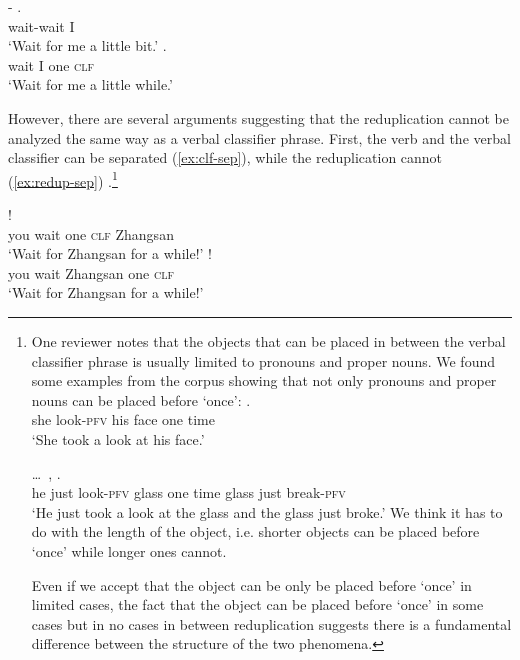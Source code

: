 \ea\label{ex:redup-clf}
	\ea \gll {}- .\\
		wait-wait I\\
		\glt `Wait for me a little bit.'
	\ex \gll {}   .\\
	wait I one \textsc{clf}\\
	\glt `Wait for me a little while.'
	\z
\z

However, there are several arguments suggesting that the reduplication cannot be analyzed the same way as a verbal classifier phrase. First, the verb and the verbal classifier can be separated (\ref{ex:clf-sep}), while the reduplication cannot (\ref{ex:redup-sep}) \citep[269]{Paris2013}.\footnote{
One reviewer notes that the objects that can be placed in between the verbal classifier phrase is usually limited to pronouns and proper nouns.
We found some examples from the corpus showing that not only pronouns and proper nouns can be placed before   `once':
\ea%
\gll {}     .\\
she look-\textsc{pfv} his face one time\\
\glt `She took a look at his face.'

\ex%
\gll {} \ldots\,     ,   .\\
he {} just look-\textsc{pfv} glass one time glass just break-\textsc{pfv}\\
\glt `He just took a look at the glass and the glass just broke.'
\z
We think it has to do with the length of the object, i.e. shorter objects can be placed before    `once' while longer ones cannot.

Even if we accept that the object can be only be placed before    `once' in limited cases,
the fact that the object can be placed before    `once' in some cases but in no cases in between reduplication suggests there is a fundamental difference between the structure of the two phenomena.
}

\ea\label{ex:clf-sep}
  \ea \gll {}    !\\
   you wait one \textsc{clf} Zhangsan\\
   \glt `Wait for Zhangsan for a while!'
  \ex \gll {}    !\\
   you wait Zhangsan one \textsc{clf}\\
   \glt `Wait for Zhangsan for a while!'
\z
\z

